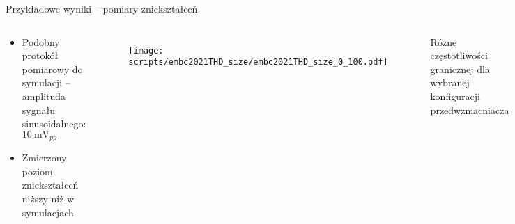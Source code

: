 
\begin{frame}{Przykładowe wyniki -- pomiary zniekształceń}
    \begin{columns}

        \vspace{-1em}
        \begin{block}{}
            \begin{itemize}
                \item Podobny protokół pomiarowy do symulacji -- amplituda sygnału sinusoidalnego: $\SI{10}{\milli\volt_{pp}}$
                \item Zmierzony poziom zniekształceń niższy niż w symulacjach
            \end{itemize}
        \end{block}
        \vspace{-1em}

            \begin{figure}[H]
                \centering
                \texttt{[image: scripts/embc2021THD\_size/embc2021THD\_size\_0\_100.pdf]}
            \end{figure}   

            
        Różne częstotliwości granicznej dla wybranej konfiguracji przedwzmacniacza
        \begin{figure}[H]
            \centering
            \texttt{[image: scripts/embc2021THD\_fc/embc2021THD\_fc.pdf]}
        \end{figure}

\end{columns}

\end{frame}


  

